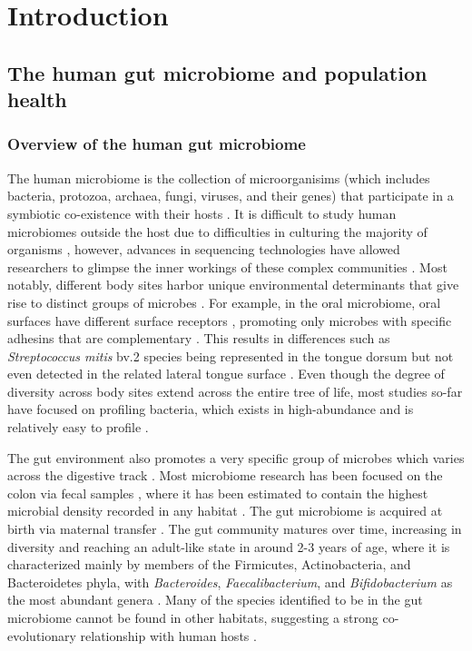 \chapter{Introduction}

\section{The human gut microbiome and population health}
\subsection{Overview of the human gut microbiome}

The human microbiome is the collection of microorganisims (which includes bacteria, protozoa, archaea, fungi, viruses, and their genes) that participate in a symbiotic co-existence with their hosts \cite{ursell2012defining}. It is difficult to study human microbiomes outside the host due to difficulties in culturing the majority of organisms \cite{walker2014phylogeny}, however, advances in sequencing technologies have allowed researchers to glimpse the inner workings of these complex communities \cite{zuniga2017elucidation}. Most notably, different body sites harbor unique environmental determinants that give rise to distinct groups of microbes \cite{consortium2012structure}. For example, in the oral microbiome, oral surfaces have different surface receptors \cite{gibbons1989bacterial}, promoting only microbes with specific adhesins that are complementary \cite{aas2005defining}. This results in differences such as \emph{Streptococcus mitis} bv.2 species being represented in the tongue dorsum but not even detected in the related lateral tongue surface \cite{aas2005defining}. Even though the degree of diversity across body sites extend across the entire tree of life, most studies so-far have focused on profiling bacteria, which exists in high-abundance and is relatively easy to profile \cite{cani2018human}. 

The gut environment also promotes a very specific group of microbes which varies across the digestive track \cite{mailhe2018repertoire, donaldson2016gut}. Most microbiome research has been focused on the colon via fecal samples \cite{tang2020current}, where it has been estimated to contain the highest microbial density recorded in any habitat \cite{sharpia2016gut}. The gut microbiome is acquired at birth via maternal transfer \cite{shao2019stunted, backhed2015dynamics, yassour2016natural}. The gut community matures over time, increasing in diversity and reaching an adult-like state in around 2-3 years of age, where it is characterized mainly by members of the Firmicutes, Actinobacteria, and Bacteroidetes phyla, with \emph{Bacteroides}, \emph{Faecalibacterium}, and \emph{Bifidobacterium} as the most abundant genera \cite{king2019baseline, metahitconsortiumadditionalmembers2011enterotypes}. Many of the species identified to be in the gut microbiome cannot be found in other habitats, suggesting a strong co-evolutionary relationship with human hosts \cite{ley2006ecological}.  


